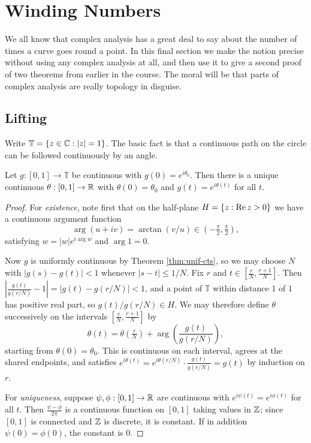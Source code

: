 \documentclass[a4paper]{scrartcl}
\begin{document}
\section{Winding Numbers}

We all know that complex analysis has a great deal to say about the number of times a curve goes round a point. In this final section we make the notion precise without using any complex analysis at all, and then use it to give a second proof of two theorems from earlier in the course. The moral will be that parts of complex analysis are really topology in disguise.

\subsection{Lifting}

Write $\mathbb{T} = \{z\in\mathbb{C} : |z|=1\}$. The basic fact is that a continuous path on the circle can be followed continuously by an angle.

\begin{theorem}\label{thm:lifting}
	Let $g : [0,1]\to\mathbb{T}$ be continuous with $g(0)=e^{i\theta_0}$. Then there is a unique continuous $\theta : [0,1]\to\mathbb{R}$ with $\theta(0)=\theta_0$ and $g(t) = e^{i\theta(t)}$ for all $t$.
\end{theorem}

\begin{proof}
	For \emph{existence}, note first that on the half-plane $H = \{z : \operatorname{Re} z>0\}$ we have a continuous argument function
	$$\arg(u+iv) = \arctan(v/u) \in (-\tfrac\pi2,\tfrac\pi2),$$
	satisfying $w = |w|e^{i\arg w}$ and $\arg 1 = 0$.

	Now $g$ is uniformly continuous by Theorem \ref{thm:unif-cts}, so we may choose $N$ with $|g(s)-g(t)|<1$ whenever $|s-t|\leq1/N$. Fix $r$ and $t\in[\tfrac rN,\tfrac{r+1}N]$. Then $\left|\frac{g(t)}{g(r/N)}-1\right| = |g(t)-g(r/N)| < 1$, and a point of $\mathbb T$ within distance $1$ of $1$ has positive real part, so $g(t)/g(r/N)\in H$. We may therefore define $\theta$ successively on the intervals $[\tfrac rN,\tfrac{r+1}N]$ by
	$$\theta(t) = \theta\!\left(\tfrac rN\right) + \arg\left(\frac{g(t)}{g(r/N)}\right),$$
	starting from $\theta(0)=\theta_0$. This is continuous on each interval, agrees at the shared endpoints, and satisfies $e^{i\theta(t)} = e^{i\theta(r/N)}\cdot\frac{g(t)}{g(r/N)} = g(t)$ by induction on $r$.

	For \emph{uniqueness}, suppose $\psi,\phi:[0,1]\to\mathbb{R}$ are continuous with $e^{i\psi(t)}=e^{i\phi(t)}$ for all $t$. Then $\frac{\psi-\phi}{2\pi}$ is a continuous function on $[0,1]$ taking values in $\mathbb{Z}$; since $[0,1]$ is connected and $\mathbb{Z}$ is discrete, it is constant. If in addition $\psi(0)=\phi(0)$, the constant is $0$.
\end{proof}
\end{document}
